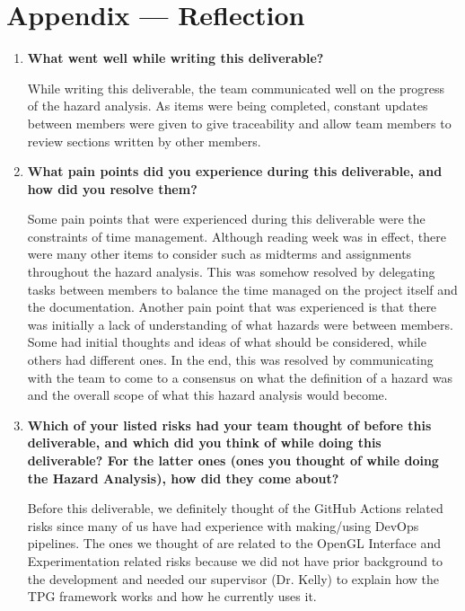 \documentclass{article}
\begin{document}
\newpage{}

\section*{Appendix --- Reflection}



\begin{enumerate}
    \item \textbf{What went well while writing this deliverable?}

While writing this deliverable, the team communicated well on the progress of the hazard analysis. As items were being completed, constant updates between members were given to give traceability and allow team members to review sections written by other members. 
 
    \item \textbf{What pain points did you experience during this deliverable, and how
    did you resolve them?}

Some pain points that were experienced during this deliverable were the constraints of time management. Although reading week was in effect, there were many other items to consider such as midterms and assignments throughout the hazard analysis. This was somehow resolved by delegating tasks between members to balance the time managed on the project itself and the documentation. Another pain point that was experienced is that there was initially a lack of understanding of what hazards were between members. Some had initial thoughts and ideas of what should be considered, while others had different ones. In the end, this was resolved by communicating with the team to come to a consensus on what the definition of a hazard was and the overall scope of what this hazard analysis would become.


    \item \textbf{Which of your listed risks had your team thought of before this
    deliverable, and which did you think of while doing this deliverable? For
    the latter ones (ones you thought of while doing the Hazard Analysis), how
    did they come about?}

Before this deliverable, we definitely thought of the GitHub Actions related risks since many of us have had experience with making/using DevOps pipelines. The ones we thought of are related to the OpenGL Interface and Experimentation related risks because we did not have prior background to the development and needed our supervisor (Dr. Kelly) to explain how the TPG framework works and how he currently uses it. 


\end{enumerate}
\end{document}
